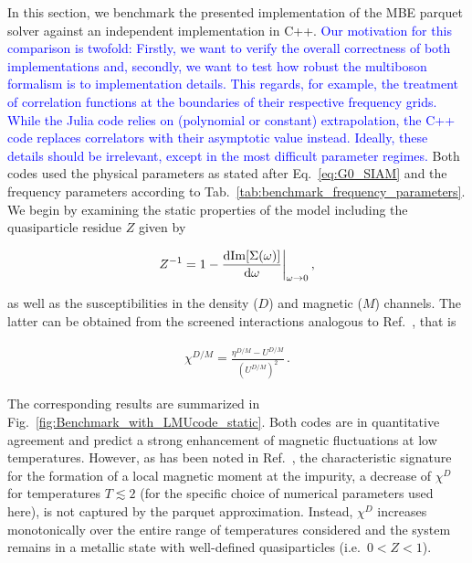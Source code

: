 \documentclass{SciPost}
\renewcommand{\Im}{\mathrm{Im}}
\begin{document}
In this section, we benchmark the presented implementation of the MBE parquet solver against an independent implementation in C++. \textcolor{blue}{Our motivation for this comparison is twofold: Firstly, we want to verify the overall correctness of both implementations and, secondly, we want to test how robust the multiboson formalism is to implementation details. This regards, for example, the treatment of correlation functions at the boundaries of their respective frequency grids. While the Julia code relies on (polynomial or constant) extrapolation, the C++ code replaces correlators with their asymptotic value instead. Ideally, these details should be irrelevant, except in the most difficult parameter regimes.} Both codes used the physical parameters as stated after Eq.~\eqref{eq:G0_SIAM} and the frequency parameters according to Tab.~\ref{tab:benchmark_frequency_parameters}.  We begin by examining the static properties of the model including the quasiparticle residue $Z$ given by
%
\begin{linenomath}
    \begin{align}
    \label{eq:quasiparticle_weight}
        Z^{-1} = 1 - \frac{\mathrm{d} \Im [\Sigma(\omega)]}{\mathrm{d}\omega}\bigg{\vert}_{\omega \to 0} \,,
    \end{align}
\end{linenomath}
%
as well as the susceptibilities in the density ($D$) and magnetic ($M$) channels. The latter can be obtained from the screened interactions analogous to Ref.~\cite{wentzell_high-frequency_2020}, that is 
%
\begin{linenomath}
    \begin{align}
        \chi^{D/M} = \frac{\eta^{D/M} - U^{D/M}}{(U^{D/M})^2} \,.
    \end{align}
\end{linenomath}
%
The corresponding results are summarized in Fig.~\ref{fig:Benchmark_with_LMUcode_static}. Both codes are in quantitative agreement and predict a strong enhancement of magnetic fluctuations at low temperatures. However, as has been noted in Ref.~\cite{Chalupa2021}, the characteristic signature for the formation of a local magnetic moment at the impurity, a decrease of $\chi^D$ for temperatures $T \lesssim 2$ (for the specific choice of numerical parameters used here), is not captured by the parquet approximation. Instead, $\chi^D$ increases monotonically over the entire range of temperatures considered and the system remains in a metallic state with well-defined quasiparticles (i.e.~$0 < Z < 1$).
\end{document}

